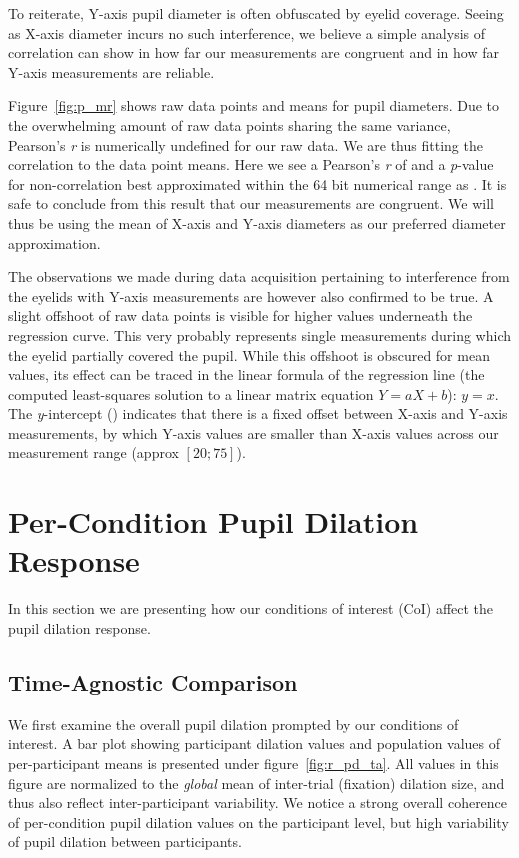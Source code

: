 	To reiterate, Y-axis pupil diameter is often obfuscated by eyelid coverage.
	Seeing as X-axis diameter incurs no such interference, we believe a simple analysis of correlation can show in how far our measurements are congruent and in how far Y-axis measurements are reliable.
	
	Figure~\ref{fig:p_mr} shows raw data points and means for pupil diameters.
	Due to the overwhelming amount of raw data points sharing the same variance, Pearson's \textit{r} is numerically undefined for our raw data.
	We are thus fitting the correlation to the data point means. 
	Here we see a Pearson's \textit{r} of  and a \textit{p}-value for non-correlation best approximated within the 64 bit numerical range as  .
	It is safe to conclude from this result that our measurements are congruent.
	We will thus be using the mean of X-axis and Y-axis diameters as our preferred diameter approximation.
	
	The observations we made during data acquisition pertaining to interference from the eyelids with Y-axis measurements are however also confirmed to be true.
	A slight offshoot of raw data points is visible for higher values underneath the regression curve.
	This very probably represents single measurements during which the eyelid partially covered the pupil.  
	While this offshoot is obscured for mean values, its effect can be traced in the linear formula of the regression line (the computed least-squares solution to a linear matrix equation $Y = aX + b$): 
	$y = $$x$.
	The \textit{y}-intercept () indicates that there is a fixed offset between X-axis and Y-axis measurements, by which Y-axis values are smaller than X-axis values across our measurement range (approx $[20;75]$).
    \section{Per-Condition Pupil Dilation Response}\label{sec:r_pd}
	In this section we are presenting how our conditions of interest (CoI) affect the pupil dilation response.
	\subsection{Time-Agnostic Comparison}\label{sec:r_pd_ta}
	    We first examine the overall pupil dilation prompted by our conditions of interest.
	    A bar plot showing participant dilation values and population values of per-participant means is presented under figure~\ref{fig:r_pd_ta}.
	    All values in this figure are normalized to the \textit{global} mean of inter-trial (fixation) dilation size, and thus also reflect inter-participant variability.
	    We notice a strong overall coherence of per-condition pupil dilation values on the participant level, but high variability of pupil dilation between participants.
	    
